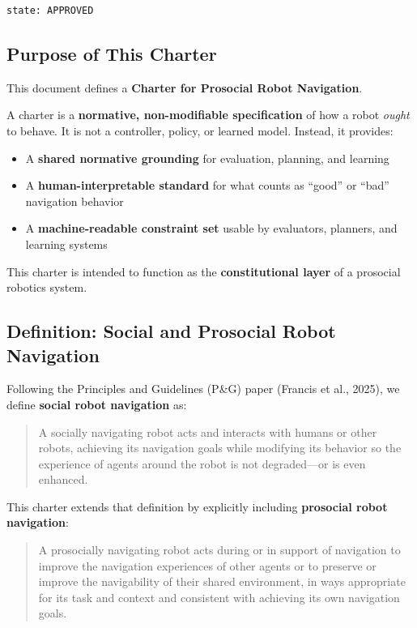 \documentclass[utf8]{frontiers_suppmat} %
\providecommand{\tightlist}{%
  \setlength{\itemsep}{0pt}\setlength{\parskip}{0pt}}
\begin{document}
\begin{lstlisting}[style=literatecard]
state: APPROVED
\end{lstlisting}

\subsection{Purpose of This Charter}\label{purpose-of-this-charter}

This document defines a \textbf{Charter for Prosocial Robot Navigation}.

A charter is a \textbf{normative, non-modifiable specification} of how a
robot \emph{ought} to behave. It is not a controller, policy, or learned
model. Instead, it provides:

\begin{itemize}
\tightlist
\item
  A \textbf{shared normative grounding} for evaluation, planning, and
  learning
\item
  A \textbf{human-interpretable standard} for what counts as ``good'' or
  ``bad'' navigation behavior
\item
  A \textbf{machine-readable constraint set} usable by evaluators,
  planners, and learning systems
\end{itemize}

This charter is intended to function as the \textbf{constitutional
layer} of a prosocial robotics system.

\subsection{Definition: Social and Prosocial Robot
Navigation}\label{definition-social-and-prosocial-robot-navigation}

Following the Principles and Guidelines (P\&G) paper (Francis et al.,
2025), we define \textbf{social robot navigation} as:

\begin{quote}
A socially navigating robot acts and interacts with humans or other
robots, achieving its navigation goals while modifying its behavior so
the experience of agents around the robot is not degraded---or is even
enhanced.
\end{quote}

This charter extends that definition by explicitly including
\textbf{prosocial robot navigation}:

\begin{quote}
A prosocially navigating robot acts during or in support of navigation
to improve the navigation experiences of other agents or to preserve or
improve the navigability of their shared environment, in ways
appropriate for its task and context and consistent with achieving its
own navigation goals.
\end{quote}
\end{document}
